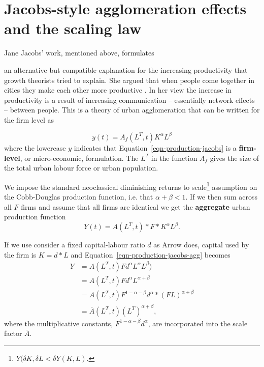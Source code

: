 {{\color{red}
\section{Jacobs-style agglomeration effects and the scaling law}\label{section-growth-Jacobs}
Jane Jacobs' work, mentioned above, formulates} %
an alternative but compatible explanation for the increasing productivity that growth theorists tried to explain. She argued that when people come together in cities they make each other more productive \cite{jacobsEconomyCities1969}. In her view the increase in productivity is a result of increasing communication -- essentially network effects -- between people.  This is a theory of urban agglomeration that can be written for the firm level as%

\begin{equation}
y(t) = A_f(L^T,t) K^\alpha L^\beta 
\label{eqn-production-jacobs}
\end{equation}
where the  lowercase $y$  indicates that Equation~\ref{eqn-production-jacobs} is a \textbf{firm-level}, or micro-economic, formulation. The $L^T$  in the function $A_f$ gives the size of the total urban labour force or urban population.

We impose the standard neoclassical diminishing returns to scale\footnote{$Y(\delta K,\delta L< \delta Y(K,L)$.} assumption on the \gls{Cobb-Douglas} production function, i.e. that 
$\alpha +\beta <1$.  
 If we then sum across all $F$ firms and assume that all firms are identical we get the \textbf{aggregate} urban production function
\begin{equation}
Y(t) = A(L^T, t)* F *K^\alpha L^\beta. 
\label{eqn-production-jacobs-agg}
\end{equation}

If we use consider a fixed capital-labour ratio $d$ as Arrow does,  capital used by the firm is  $K=d*L$ and Equation~\ref{eqn-production-jacobs-agg} becomes
\begin{align}
Y &= A(L^T, t) F d^\alpha L^\alpha L^\beta) \nonumber\\
&=A(L^T, t)F d^\alpha L^{\alpha +\beta} \nonumber\\
&= A(L^T, t) F^{1-\alpha -\beta}d^\alpha * (F L)^{\alpha +\beta} \nonumber \\
&=\bar A(L^T, t) (L^T)^{\alpha +\beta},  
 \label{eqn-production-jacobs-city-2}
\end{align} 
where the  multiplicative constants,  $F^{1-\alpha -\beta}d^\alpha$, are incorporated into the scale factor $\bar A$. 

}
